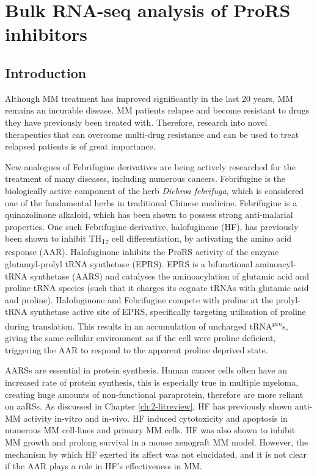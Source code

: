 \chapter{Bulk RNA-seq analysis of ProRS inhibitors}\label{ch:5-bulk}


\section{Introduction}
Although MM treatment has improved significantly in the last 20 years, MM remains an incurable disease.
MM patients relapse and become resistant to drugs they have previously been treated with.
Therefore, research into novel therapeutics that can overcome multi-drug resistance and can be used to treat relapsed patients is of great importance.

New analogues of Febrifugine derivatives are being actively researched for the treatment of many diseases, including numerous cancers\cite{halo2012clin, halo2012clin2}.
Febrifugine is the biologically active component of the herb \textit{Dichroa febrifuga}, which is considered one of the fundamental herbs in traditional Chinese medicine\cite{koepfli1949alkaloids}.
Febrifugine is a quinazolinone alkaloid, which has been shown to possess strong anti-malarial properties.
One such Febrifugine derivative, halofuginone (HF), has previously been shown to inhibit TH\textsubscript{17} cell differentiation, by activating the amino acid response (AAR)\cite{sundrud2009halofuginone}.
Halofuginone inhibits the ProRS activity of the enzyme glutamyl-prolyl tRNA synthetase (EPRS)\cite{keller2012halofuginone}.
EPRS is a bifunctional aminoacyl-tRNA synthetase (AARS) and catalyses the aminoacylation of glutamic acid and proline tRNA species (such that it charges its cognate tRNAs with glutamic acid and proline).
Halofuginone and Febrifugine compete with proline at the prolyl-tRNA synthetase active site of EPRS, specifically targeting utilisation of proline during translation\cite{keller2012halofuginone}.
This results in an accumulation of uncharged tRNA\textsuperscript{pro}s, giving the same cellular environment as if the cell were proline deficient, triggering the AAR to respond to the apparent proline deprived state.

AARSs are essential in protein synthesis.
Human cancer cells often have an increased rate of protein synthesis, this is especially true in multiple myeloma, creating huge amounts of non-functional paraprotein, therefore are more reliant on aaRSs.
As discussed in Chapter \ref{ch:2-litreview}, HF has previously shown anti-MM activity in-vitro and in-vivo\cite{leiba2012halofuginone}.
HF induced cytotoxicity and apoptosis in numerous MM cell-lines and primary MM cells.
HF was also shown to inhibit MM growth and prolong survival in a mouse xenograft MM model.
However, the mechanism by which HF exerted its affect was not elucidated, and it is not clear if the AAR plays a role in HF's effectiveness in MM\@.

